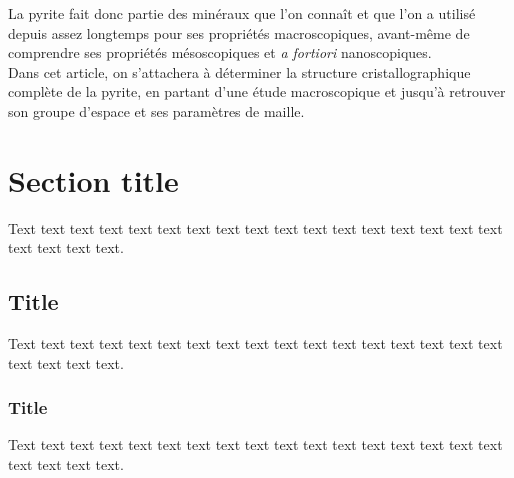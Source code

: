 La pyrite fait donc partie des minéraux que l'on connaît et que l'on a utilisé depuis assez longtemps pour ses propriétés macroscopiques, avant-même de comprendre ses propriétés mésoscopiques et \textit{a fortiori} nanoscopiques.\\
Dans cet article, on s'attachera à déterminer la structure cristallographique complète de la pyrite, en partant d'une étude macroscopique et jusqu'à retrouver son groupe d'espace et ses paramètres de maille.

\section{Section title}

Text text text text text text text text text text text text text text
text text text text text text text.

\subsection{Title}

Text text text text text text text text text text text text text text
text text text text text text text.

\subsubsection{Title}

Text text text text text text text text text text text text text text
text text text text text text text.
